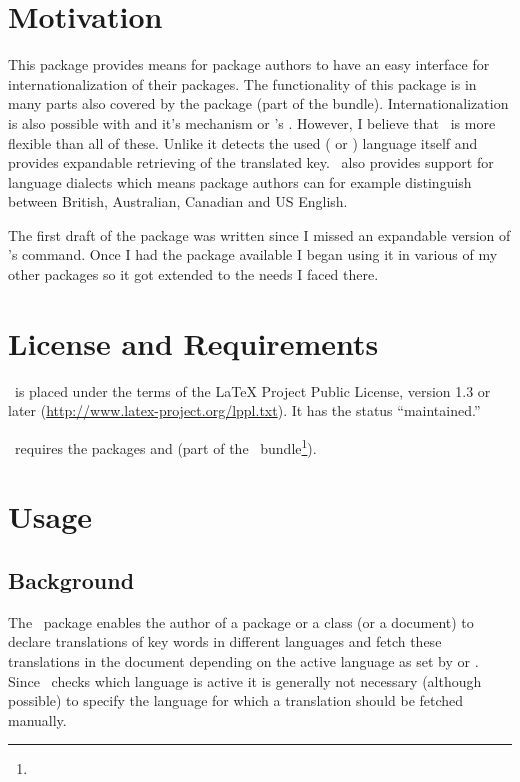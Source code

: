 \documentclass[DIV11,toc=index,toc=bib,numbers=noendperiod]{cnpkgdoc}
\begin{document}
\section{Motivation}
This package provides means for package authors to have an easy interface for
internationalization of their packages.  The functionality of this package is
in many parts also covered by the package  (part of the
 bundle).  Internationalization is also possible with
 and it's  mechanism or
\KOMAScript's .  However, I believe that
\translations\ is more flexible than all of these.  Unlike 
it detects the used ( or ) language itself and
provides expandable retrieving of the translated key.  \translations\ also
provides support for language dialects which means package authors can for
example distinguish between British, Australian, Canadian and US English.

The first draft of the package was written since I missed an expandable
version of 's  command.  Once I had the
package available I began using it in various of my other packages so it got
extended to the needs I faced there.

\section{License and Requirements}\label{sec:license}
\translations\ is placed under the terms of the \LaTeX{} Project Public
License, version 1.3 or later (\url{http://www.latex-project.org/lppl.txt}).
It has the  status ``maintained.''

\translations\ requires the packages  and 
(part of the \KOMAScript\ bundle\footnote{}).

\section{Usage}
\subsection{Background}
The \translations\ package enables the author of a package or a class (or a
document) to declare translations of key words in different languages and
fetch these translations in the document depending on the active language as
set by  or .  Since \translations\ checks
which language is active it is generally not necessary (although possible) to
specify the language for which a translation should be fetched manually.
\end{document}
